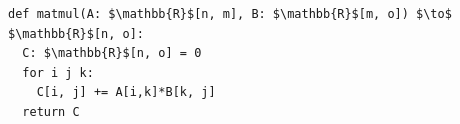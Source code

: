 \documentclass[border=10pt]{standalone}
\begin{document}
\begin{lstlisting}
def matmul(A: $\mathbb{R}$[n, m], B: $\mathbb{R}$[m, o]) $\to$ $\mathbb{R}$[n, o]:
  C: $\mathbb{R}$[n, o] = 0
  for i j k:
    C[i, j] += A[i,k]*B[k, j]
  return C
\end{lstlisting}
\end{document}
